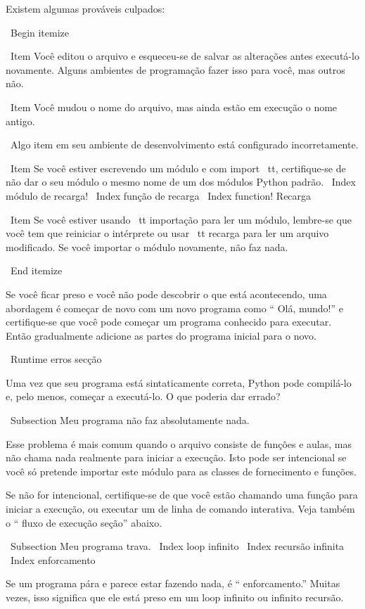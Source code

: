\documentclass[10pt]{book}
\begin{document}
{{{{{{{{{{{{{{{{{{{{{Existem algumas prováveis ​​culpados:

\ Begin {itemize}

\ Item Você editou o arquivo e esqueceu-se de salvar as alterações antes
executá-lo novamente. Alguns ambientes de programação fazer isso
para você, mas outros não.

\ Item Você mudou o nome do arquivo, mas ainda estão em execução
o nome antigo.

\ Algo item em seu ambiente de desenvolvimento está configurado
incorretamente.

\ Item Se você estiver escrevendo um módulo e com {import \ tt},
certifique-se de não dar o seu módulo o mesmo nome de um
dos módulos Python padrão.
\ Index {módulo de recarga!}
\ Index {função de recarga}
\ Index {function! Recarga}

\ Item Se você estiver usando {\ tt importação} para ler um módulo, lembre-se
que você tem que reiniciar o intérprete ou usar {\ tt recarga}
para ler um arquivo modificado. Se você importar o módulo novamente,
não faz nada.

\ End {itemize}

Se você ficar preso e você não pode descobrir o que está acontecendo, uma
abordagem é começar de novo com um novo programa como `` Olá, mundo!''
e certifique-se que você pode começar um programa conhecido para executar. Então gradualmente adicione
as partes do programa inicial para o novo.


\ {Runtime erros} secção

Uma vez que seu programa está sintaticamente correta,
Python pode compilá-lo e, pelo menos, começar a executá-lo. O que poderia
dar errado?


\ Subsection {Meu programa não faz absolutamente nada.}

Esse problema é mais comum quando o arquivo consiste de funções e
aulas, mas não chama nada realmente para iniciar a execução.
Isto pode ser intencional se você só pretende importar este módulo para
as classes de fornecimento e funções.

Se não for intencional, certifique-se de que você
estão chamando uma função para iniciar a execução, ou executar um de
linha de comando interativa. Veja também o `` fluxo de execução seção''
abaixo.


\ Subsection {Meu programa trava.}
\ Index {loop infinito}
\ Index {recursão infinita}
\ Index {} enforcamento

Se um programa pára e parece estar fazendo nada, é `` enforcamento.''
Muitas vezes, isso significa que ele está preso em um loop infinito ou infinito
recursão.

}}}}}}}}}}}}}}}}}}}}}
\end{document}
